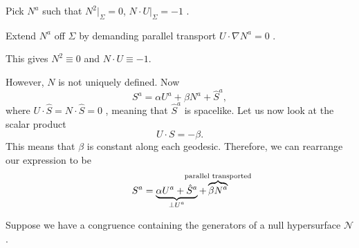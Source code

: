 Pick $N^a$  such that $N^2 \rvert_{\Sigma} = 0$, $N \cdot U \rvert_\Sigma = -1$ .
\begin{figure}[tbhp]
  \centering
  \def\svgwidth{0.4\columnwidth}
  
  \caption{}
  \label{fig:l9f3}
\end{figure}
Extend $N^a$  off $\Sigma$  by demanding parallel transport $U \cdot \nabla N^a = 0$ .
\begin{exercise}
  This gives $N^2 \equiv 0$ and $N \cdot U \equiv -1$.
\end{exercise}
However, $N$  is not uniquely defined.
Now 
\begin{equation}
  S^a = \alpha U^a + \beta N^a + \hat{S}^a,
\end{equation}
where $U \cdot \hat{S} = N \cdot \hat{S} = 0$ , meaning that $\hat{S}^a$  is spacelike.
Let us now look at the scalar product
\begin{equation}
  U \cdot S = -\beta.
\end{equation}
This means that $\beta$  is constant along each geodesic.
Therefore, we can rearrange our expression to be
\begin{equation}
  S^a = \underbrace{\alpha U^a + \hat{S}^a}_{\mathclap{\perp U^a}} + \overbrace{\beta N^a}^{\mathclap{\text{parallel transported}}}
\end{equation}

\begin{example}[]
  Suppose we have a congruence containing the generators of a null hypersurface $\mathcal{N}$.
\end{example}
